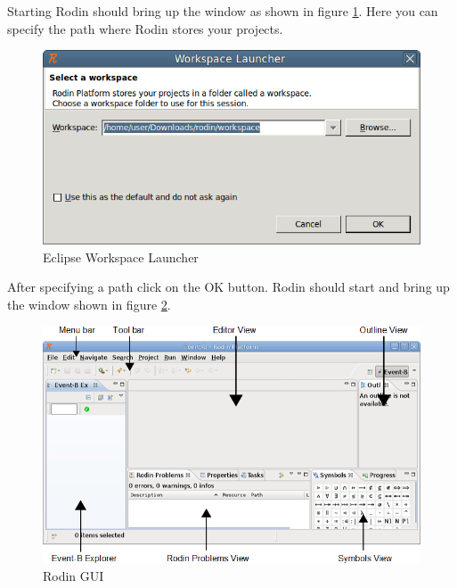 Starting Rodin should bring up the window as shown in figure \ref{fig_tut_02_workspace_launcher}. Here you can specify the path where Rodin stores your projects.

\begin{figure}[!h]
\begin{center}
	\includegraphics{img/tutorial/tut_02_install1.png}
	\caption{Eclipse Workspace Launcher}
	\label{fig_tut_02_workspace_launcher}
\end{center}
\end{figure}

After specifying a path click on the \textsf{OK} button. Rodin should start and bring up the window shown in figure \ref{fig_tut_02_rodin_gui}.


\begin{figure}[!h]
\begin{center}
	\includegraphics{img/tutorial/tut_02_install2.png}
	\caption{Rodin GUI}
	\label{fig_tut_02_rodin_gui}
\end{center}
\end{figure}

